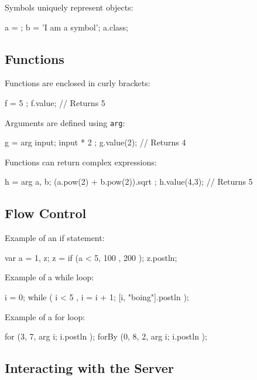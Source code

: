 Symbols uniquely represent objects:

\begin{supercollider*}
a = \symbol;
b = 'I am a symbol';
a.class;
\end{supercollider*}

\subsection{Functions}

Functions are enclosed in curly brackets:

\begin{supercollider*}
f = { 5 };
f.value; // Returns 5
\end{supercollider*}

Arguments are defined using \texttt{arg}:

\begin{supercollider*}
g = { arg input; input * 2 };
g.value(2); // Returns 4
\end{supercollider*}

Functions can return complex expressions:

\begin{supercollider*}
h = { arg a, b; (a.pow(2) + b.pow(2)).sqrt };
h.value(4,3); // Returns 5
\end{supercollider*}

\subsection{Flow Control}

Example of an if statement:

\begin{supercollider*}
var a = 1, z;
z = if (a < 5, { 100 }, { 200 });
z.postln;
\end{supercollider*}

Example of a while loop:

\begin{supercollider*}
i = 0;
while ( { i < 5 }, { i = i + 1; [i, "boing"].postln });
\end{supercollider*}

Example of a for loop:

\begin{supercollider*}
for (3, 7, { arg i; i.postln });
forBy (0, 8, 2, { arg i; i.postln });
\end{supercollider*}

\subsection{Interacting with the Server}

